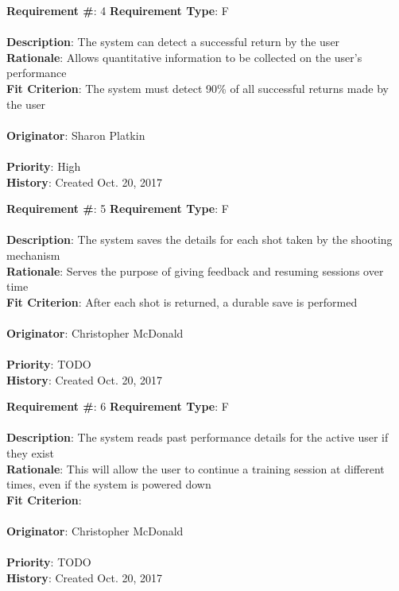 \documentclass[11pt]{article}
\begin{document}
\begin{framed}
	\noindent\textbf{Requirement \#}: 4 \hfill \textbf{Requirement Type}: F \hfill\\\\
	\noindent\textbf{Description}: The system can detect a successful return by the user \\
	\textbf{Rationale}: Allows quantitative information to be collected on the user's performance \\
	\textbf{Fit Criterion}: The system must detect 90\% of all successful returns made by the user\\\\
	\textbf{Originator}: Sharon Platkin \\\\
	\textbf{Priority}: High \hfill \\
	\noindent\textbf{History}: Created Oct. 20, 2017
\end{framed}

\begin{framed}
	\noindent\textbf{Requirement \#}: 5 \hfill \textbf{Requirement Type}: F \hfill\\\\
	\noindent\textbf{Description}: The system saves the details for each shot taken by the shooting mechanism \\
	\textbf{Rationale}: Serves the purpose of giving feedback and resuming sessions over time \\
	\textbf{Fit Criterion}: After each shot is returned, a durable save is performed \\\\
	\textbf{Originator}: Christopher McDonald \\\\
	\textbf{Priority}: TODO \hfill \\
	\noindent\textbf{History}: Created Oct. 20, 2017
\end{framed}

\begin{framed}
	\noindent\textbf{Requirement \#}: 6 \hfill \textbf{Requirement Type}: F \hfill\\\\
	\noindent\textbf{Description}: The system reads past performance details for the active user if they exist \\
	\textbf{Rationale}: This will allow the user to continue a training session at different times, even if the system is powered down \\
	\textbf{Fit Criterion}: \\\\
	\textbf{Originator}: Christopher McDonald \\\\
	\textbf{Priority}: TODO \hfill \\
	\noindent\textbf{History}: Created Oct. 20, 2017
\end{framed}
\end{document}
